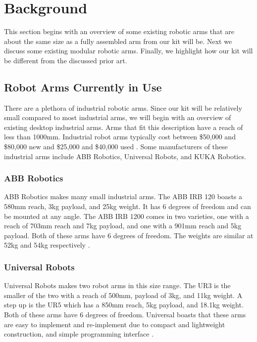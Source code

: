 \section{Background}
This section begins with an overview of some existing robotic arms that are about the same size as a fully assembled arm from our kit will be. Next we discuss some existing modular robotic arms. Finally, we highlight how our kit will be different from the discussed prior art.

\subsection{Robot Arms Currently in Use}
There are a plethora of industrial robotic arms. Since our kit will be relatively small compared to most industrial arms, we will begin with an overview of existing desktop industrial arms. Arms that fit this description have a reach of less than 1000mm. Industrial robot arms typically cost between \$50,000 and \$80,000 new and \$25,000 and \$40,000 used \cite{RobotWorx}. Some manufacturers of these industrial arms include ABB Robotics, Universal Robots, and KUKA Robotics.

\subsubsection{ABB Robotics}
ABB Robotics makes many small industrial arms. The ABB IRB 120 boasts a 580mm reach, 3kg payload, and 25kg weight. It has 6 degrees of freedom and can be mounted at any angle. The ABB IRB 1200 comes in two varieties, one with a reach of 703mm reach and 7kg payload, and one with a 901mm reach and 5kg payload. Both of these arms have 6 degrees of freedom. The weights are similar at 52kg and 54kg respectively \cite{RobotWorx}.

\subsubsection{Universal Robots}
Universal Robots makes two robot arms in this size range. The UR3 is the smaller of the two with a reach of 500mm, payload of 3kg, and 11kg weight. A step up is the UR5 which has a 850mm reach, 5kg payload, and 18.1kg weight. Both of these arms have 6 degrees of freedom. Universal boasts that these arms are easy to implement and re-implement due to compact and lightweight construction, and simple programming interface \cite{RobotWorx}.

